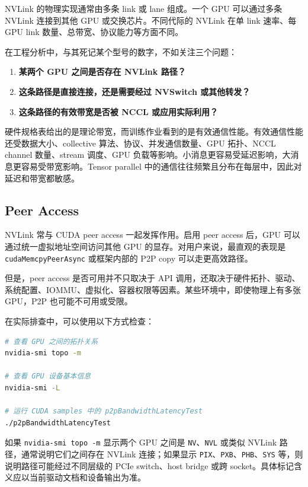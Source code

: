 NVLink 的物理实现通常由多条 link 或 lane 组成。一个 GPU 可以通过多条 NVLink 连接到其他 GPU 或交换芯片。不同代际的 NVLink 在单 link 速率、每 GPU link 数量、总带宽、协议能力等方面不同。

在工程分析中，与其死记某个型号的数字，不如关注三个问题：

\begin{enumerate}
  \item \textbf{某两个 GPU 之间是否存在 NVLink 路径？}
  \item \textbf{这条路径是直接连接，还是需要经过 NVSwitch 或其他转发？}
  \item \textbf{这条路径的有效带宽是否被 NCCL 或应用实际利用？}
\end{enumerate}

硬件规格表给出的是理论带宽，而训练作业看到的是有效通信性能。有效通信性能还受数据大小、collective 算法、协议、并发通信数量、GPU 拓扑、NCCL channel 数量、stream 调度、GPU 负载等影响。小消息更容易受延迟影响，大消息更容易受带宽影响。Tensor parallel 中的通信往往频繁且分布在每层中，因此对延迟和带宽都敏感。

\subsection{Peer Access}
\label{subsec:nvlink-peer-access}

NVLink 常与 CUDA peer access 一起发挥作用。启用 peer access 后，GPU 可以通过统一虚拟地址空间访问其他 GPU 的显存。对用户来说，最直观的表现是 \texttt{cudaMemcpyPeerAsync} 或框架内部的 P2P copy 可以走更高效路径。

但是，peer access 是否可用并不只取决于 API 调用，还取决于硬件拓扑、驱动、系统配置、IOMMU、虚拟化、容器权限等因素。某些环境中，即使物理上有多张 GPU，P2P 也可能不可用或受限。

在实际排查中，可以使用以下方式检查：

\begin{lstlisting}[language=bash,caption={检查 GPU 拓扑和 P2P 能力的常用命令},label={lst:check-topology-p2p}]
# 查看 GPU 之间的拓扑关系
nvidia-smi topo -m

# 查看 GPU 设备基本信息
nvidia-smi -L

# 运行 CUDA samples 中的 p2pBandwidthLatencyTest
./p2pBandwidthLatencyTest
\end{lstlisting}

如果 \texttt{nvidia-smi topo -m} 显示两个 GPU 之间是 \texttt{NV}、\texttt{NVL} 或类似 NVLink 路径，通常说明它们之间存在 NVLink 连接；如果显示 \texttt{PIX}、\texttt{PXB}、\texttt{PHB}、\texttt{SYS} 等，则说明路径可能经过不同层级的 PCIe switch、host bridge 或跨 socket。具体标记含义应以当前驱动文档和设备输出为准。

